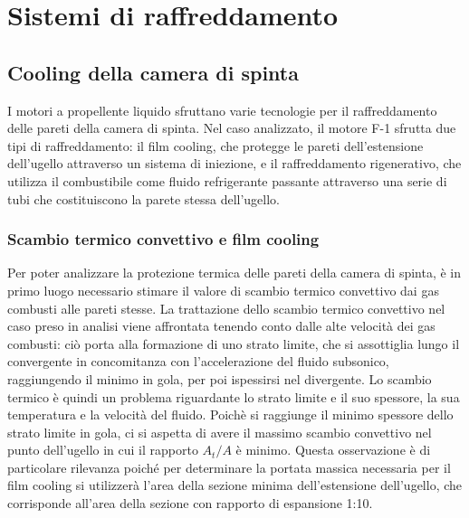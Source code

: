 \section{Sistemi di raffreddamento}
\label{sec:raffreddamento}

\subsection{Cooling della camera di spinta}
\label{subsec:cooling camera}

I motori a propellente liquido sfruttano varie tecnologie per il raffreddamento delle pareti della camera di spinta. Nel caso analizzato, il motore F-1 sfrutta due tipi di raffreddamento: il film cooling, che protegge le pareti dell'estensione dell'ugello attraverso un sistema di iniezione, e il raffreddamento rigenerativo, che utilizza il combustibile come fluido refrigerante passante attraverso una serie di tubi che costituiscono la parete stessa dell'ugello.

\subsubsection{Scambio termico convettivo e film cooling}
\label{subsubsec:film cooling}


Per poter analizzare la protezione termica delle pareti della camera di spinta, è in primo luogo necessario stimare il valore di scambio termico convettivo dai gas combusti alle pareti stesse. La trattazione dello scambio termico convettivo nel caso preso in analisi viene affrontata tenendo conto dalle alte velocità dei gas combusti: ciò porta alla formazione di uno strato limite, che si assottiglia lungo il convergente in concomitanza con l'accelerazione del fluido subsonico, raggiungendo il minimo in gola, per poi ispessirsi nel divergente. Lo scambio termico è quindi un problema riguardante lo strato limite e il suo spessore, la sua temperatura e la velocità del fluido. Poichè si raggiunge il minimo spessore dello strato limite in gola, ci si aspetta di avere il massimo scambio convettivo nel punto dell'ugello in cui il rapporto $A_t/A$ è minimo. Questa osservazione è di particolare rilevanza poiché per determinare la portata massica necessaria per il film cooling si utilizzerà l'area della sezione minima dell'estensione dell'ugello, che corrisponde all'area della sezione con rapporto di espansione 1:10.

